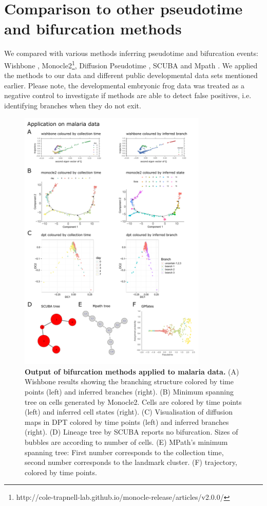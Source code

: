 \section{Comparison to other pseudotime and bifurcation methods}

We compared  with various methods inferring pseudotime and bifurcation events: Wishbone \cite{Setty2016-ie}, Monocle2\footnote{http://cole-trapnell-lab.github.io/monocle-release/articles/v2.0.0/}, Diffusion Pseudotime \cite{Haghverdi2016-tm}, SCUBA \cite{Marco2014-rf} and Mpath \cite{Chen2016-ar}. We applied the methods to our data and different public developmental data sets mentioned earlier. Please note, the developmental embryonic frog data was treated as a negative control to investigate if methods are able to detect false positives, i.e. identifying branches when they do not exit.

\begin{figure}
    \centering
    \includegraphics[width=0.8\textwidth]{"results_malaria"}
    \caption[Output of bifurcation methods applied to malaria data]{\textbf{Output of bifurcation methods applied to malaria data.} (A) Wishbone results showing the branching structure colored by time points (left) and inferred branches (right). (B) Minimum spanning tree on cells generated by Monocle2. Cells are colored by time points (left) and inferred cell states (right). (C) Visualisation of diffusion maps in DPT colored by time points (left) and inferred branches (right). (D) Lineage tree by SCUBA reports no bifurcation. Sizes of bubbles are according to number of cells. (E) MPath's minimum spanning tree: First number corresponds to the collection time, second number corresponds to the landmark cluster. (F)  trajectory, colored by time points.}
    \label{fig:res_malaria}
\end{figure}

